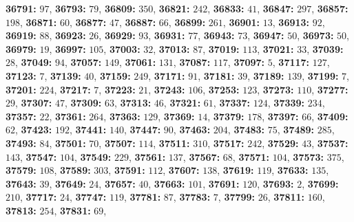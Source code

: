 \textsf{\bfseries 36791:} $97$, \textsf{\bfseries 36793:} $79$, \textsf{\bfseries 36809:} $350$, \textsf{\bfseries 36821:} $242$, \textsf{\bfseries 36833:} $41$, \textsf{\bfseries 36847:} $297$, \textsf{\bfseries 36857:} $198$, \textsf{\bfseries 36871:} $60$, \textsf{\bfseries 36877:} $47$, \textsf{\bfseries 36887:} $66$, \textsf{\bfseries 36899:} $261$, \textsf{\bfseries 36901:} $13$, \textsf{\bfseries 36913:} $92$, \textsf{\bfseries 36919:} $88$, \textsf{\bfseries 36923:} $26$, \textsf{\bfseries 36929:} $93$, \textsf{\bfseries 36931:} $77$, \textsf{\bfseries 36943:} $73$, \textsf{\bfseries 36947:} $50$, \textsf{\bfseries 36973:} $50$, \textsf{\bfseries 36979:} $19$, \textsf{\bfseries 36997:} $105$, \textsf{\bfseries 37003:} $32$, \textsf{\bfseries 37013:} $87$, \textsf{\bfseries 37019:} $113$, \textsf{\bfseries 37021:} $33$, \textsf{\bfseries 37039:} $28$, \textsf{\bfseries 37049:} $94$, \textsf{\bfseries 37057:} $149$, \textsf{\bfseries 37061:} $131$, \textsf{\bfseries 37087:} $117$, \textsf{\bfseries 37097:} $5$, \textsf{\bfseries 37117:} $127$, \textsf{\bfseries 37123:} $7$, \textsf{\bfseries 37139:} $40$, \textsf{\bfseries 37159:} $249$, \textsf{\bfseries 37171:} $91$, \textsf{\bfseries 37181:} $39$, \textsf{\bfseries 37189:} $139$, \textsf{\bfseries 37199:} $7$, \textsf{\bfseries 37201:} $224$, \textsf{\bfseries 37217:} $7$, \textsf{\bfseries 37223:} $21$, \textsf{\bfseries 37243:} $106$, \textsf{\bfseries 37253:} $123$, \textsf{\bfseries 37273:} $110$, \textsf{\bfseries 37277:} $29$, \textsf{\bfseries 37307:} $47$, \textsf{\bfseries 37309:} $63$, \textsf{\bfseries 37313:} $46$, \textsf{\bfseries 37321:} $61$, \textsf{\bfseries 37337:} $124$, \textsf{\bfseries 37339:} $234$, \textsf{\bfseries 37357:} $22$, \textsf{\bfseries 37361:} $264$, \textsf{\bfseries 37363:} $129$, \textsf{\bfseries 37369:} $14$, \textsf{\bfseries 37379:} $178$, \textsf{\bfseries 37397:} $66$, \textsf{\bfseries 37409:} $62$, \textsf{\bfseries 37423:} $192$, \textsf{\bfseries 37441:} $140$, \textsf{\bfseries 37447:} $90$, \textsf{\bfseries 37463:} $204$, \textsf{\bfseries 37483:} $75$, \textsf{\bfseries 37489:} $285$, \textsf{\bfseries 37493:} $84$, \textsf{\bfseries 37501:} $70$, \textsf{\bfseries 37507:} $114$, \textsf{\bfseries 37511:} $310$, \textsf{\bfseries 37517:} $242$, \textsf{\bfseries 37529:} $43$, \textsf{\bfseries 37537:} $143$, \textsf{\bfseries 37547:} $104$, \textsf{\bfseries 37549:} $229$, \textsf{\bfseries 37561:} $137$, \textsf{\bfseries 37567:} $68$, \textsf{\bfseries 37571:} $104$, \textsf{\bfseries 37573:} $375$, \textsf{\bfseries 37579:} $108$, \textsf{\bfseries 37589:} $303$, \textsf{\bfseries 37591:} $112$, \textsf{\bfseries 37607:} $138$, \textsf{\bfseries 37619:} $119$, \textsf{\bfseries 37633:} $135$, \textsf{\bfseries 37643:} $39$, \textsf{\bfseries 37649:} $24$, \textsf{\bfseries 37657:} $40$, \textsf{\bfseries 37663:} $101$, \textsf{\bfseries 37691:} $120$, \textsf{\bfseries 37693:} $2$, \textsf{\bfseries 37699:} $210$, \textsf{\bfseries 37717:} $24$, \textsf{\bfseries 37747:} $119$, \textsf{\bfseries 37781:} $87$, \textsf{\bfseries 37783:} $7$, \textsf{\bfseries 37799:} $26$, \textsf{\bfseries 37811:} $160$, \textsf{\bfseries 37813:} $254$, \textsf{\bfseries 37831:} $69$, 
